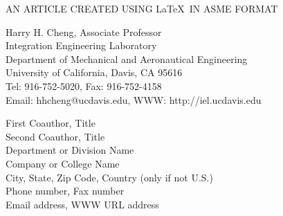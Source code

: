 \begin{center}
{\footnotesize{\hvb
AN ARTICLE CREATED USING \LaTeX\ IN ASME FORMAT\\
}}

\vspace{10pt}
\setlength{\baselineskip}{11pt}

{\footnotesize
{\hvb Harry H. Cheng}, {\hv Associate Professor} \\
{\hv
Integration Engineering Laboratory\\
Department of Mechanical and Aeronautical Engineering \\
University of California, Davis, CA 95616\\
Tel: 916-752-5020, Fax: 916-752-4158\\ 
Email: hhcheng@ucdavis.edu, WWW: http://iel.ucdavis.edu\\
}}

\vspace{10pt}
{\footnotesize
{\hvb First Coauthor}, {\hv Title} \\
{\hvb Second Coauthor}, {\hv Title} \\
{\hv
Department or Division Name \\
Company or College Name\\
City, State, Zip Code, Country (only if not U.S.)\\
Phone number, Fax number \\ 
Email address, WWW URL address\
}}


\end{center}

